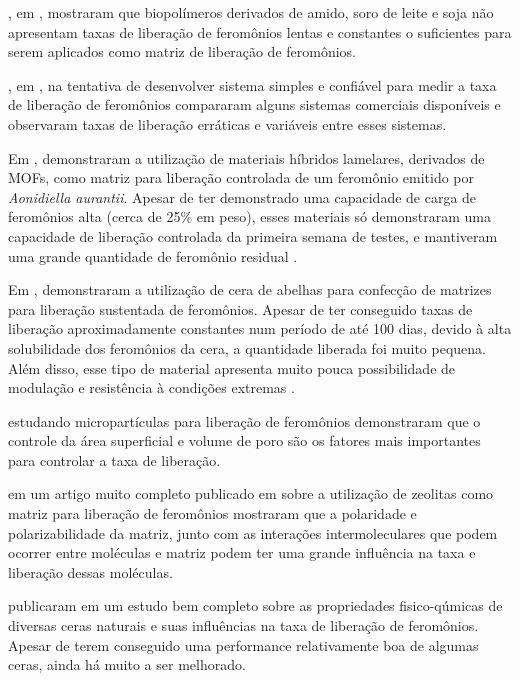 , em \citeyear{atterholt1998study}, mostraram que biopolímeros derivados de amido, soro de leite e soja não apresentam taxas de liberação de feromônios lentas e constantes o suficientes para serem aplicados como matriz de liberação de feromônios. 

, em \citeyear{tomaszewska2005evaluation}, na tentativa de desenvolver sistema simples e confiável para medir a taxa de liberação de feromônios compararam alguns sistemas comerciais disponíveis e observaram taxas de liberação erráticas e variáveis entre esses sistemas.

Em \citeyear{moreno2016single},  demonstraram a utilização de materiais híbridos lamelares, derivados de MOFs, como matriz para liberação controlada de um feromônio emitido por \textit{Aonidiella aurantii}. Apesar de ter demonstrado uma capacidade de carga de feromônios alta (cerca de 25\% em peso), esses materiais só demonstraram uma capacidade de liberação controlada da primeira semana de testes, e mantiveram uma grande quantidade de feromônio residual \cite{moreno2016single}. 

Em \citeyear{yoon2017sustainable},  demonstraram a utilização de cera de abelhas para confecção de matrizes para liberação sustentada de feromônios. Apesar de ter conseguido taxas de liberação aproximadamente constantes num período de até 100 dias, devido à alta solubilidade dos feromônios da cera, a quantidade liberada foi muito pequena. Além disso, esse tipo de material apresenta muito pouca possibilidade de modulação e resistência à condições extremas \cite{yoon2017sustainable}.

 estudando micropartículas para liberação de feromônios demonstraram que o controle da área superficial e volume de poro são os fatores mais importantes para controlar a taxa de liberação. 

 em um artigo muito completo publicado em \citeyear{munoz2001zeolites} sobre a utilização de zeolitas como matriz para liberação de feromônios mostraram que a polaridade e polarizabilidade da matriz, junto com as interações intermoleculares que podem ocorrer entre moléculas e matriz podem ter uma grande influência na taxa e liberação dessas moléculas.

 publicaram em \citeyear{slodowicz2017physicochemical} um estudo bem completo sobre as propriedades fisico-qúmicas de diversas ceras naturais e suas influências na taxa de liberação de feromônios. Apesar de terem conseguido uma performance relativamente boa de algumas ceras, ainda há muito a ser melhorado. 
